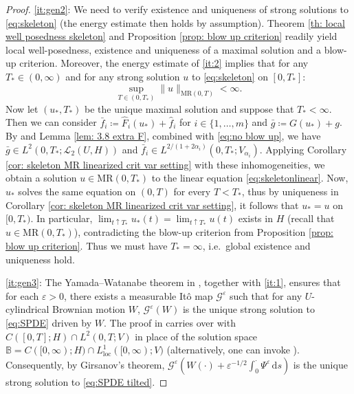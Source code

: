 \documentclass{amsart}
\newcommand{\dd}{\,\mathrm{d}}
\renewcommand{\MR}{\mathrm{MR}}
\newcommand{\UH}{\mathscr{L}_2(U,H)}
\newcommand{\<}{\langle}
\newcommand{\?}{\rangle}
\newcommand{\loc}{\mathrm{loc}}
\newcommand{\ceqq}{\coloneqq}
\newcommand{\bphieps}{\Psi^{\eps}}
\theoremstyle{plain}
\theoremstyle{remark}
\theoremstyle{plain}
\numberwithin{equation}{section}
\newcommand{\G}{\mathcal{G}}
\newcommand{\eps}{\varepsilon}
\begin{document}
\begin{proof}
\ref{it:gen2}:  We need to verify existence and uniqueness of strong solutions to \eqref{eq:skeleton} (the energy estimate then   holds by assumption). Theorem \ref{th: local well posedness skeleton} and Proposition \ref{prop: blow up criterion}  readily yield local well-posedness, existence and uniqueness of a maximal solution and a blow-up criterion. 
Moreover,  the energy estimate of  \ref{it:2} implies that for any $T_*\in(0,\infty)$ and  for any strong solution $u$ to \eqref{eq:skeleton} on $[0,T_*]$: 
\begin{equation}\label{eq:no blow up}
    \sup_{T\in(0,T_*)}\|u\|_{\MR(0,T)}<\infty. 
\end{equation}
Now let $(u_*,T_*)$ be the unique maximal solution and suppose that $T_*<\infty$. Then we can consider $\bar{f}_i\ceqq \hat{F}_i(u_*)+\hat{f}_i$ for $i\in\{1,\ldots,m\}$ and $\bar{g}\ceqq G(u_*)+g$. By \cite[Lem.\ 3.8(iv)]{TV24} and Lemma \ref{lem: 3.8 extra F}, combined with \eqref{eq:no blow up}, we have  $\bar{g}\in L^2(0,T_*;\UH)$ and $\bar{f}_i\in L^{2/(1+2\alpha_i)}(0,T_*;V_{\alpha_i})$. Applying  
  Corollary \ref{cor: skeleton MR linearized crit var setting} with these inhomogeneities, we obtain a solution $u\in\MR(0,T_*)$ to the linear equation \eqref{eq:skeletonlinear}. Now,  $u_*$ solves the same equation on $(0,T)$ for every $T<T_*$, thus by  uniqueness in Corollary \ref{cor: skeleton MR linearized crit var setting}, it follows that $u_*=u$ on $[0,T_*)$. In particular, $\lim_{t\uparrow T_*}u_*(t)=\lim_{t\uparrow T_*}u(t)$ exists in $H$ (recall that $u\in \MR(0,T_*)$), contradicting the blow-up criterion from Proposition \ref{prop: blow up criterion}. Thus we must have $T_*=\infty$, i.e.\  global existence and uniqueness hold. 

\ref{it:gen3}: 
The Yamada--Watanabe theorem in \cite{rock08}, together with \ref{it:1},  ensures  that for each $\eps>0$,   there exists a measurable It\^o map $\G^\eps$ such that for any $U$-cylindrical Brownian motion $W$, $\G^\eps(W)$ is the unique strong solution to \eqref{eq:SPDE} driven by $W$. The proof in \cite{rock08} carries over with $C([0,T];H)\cap L^2(0,T;V)$ in place of the solution space $\mathbb{B}=C([0,\infty);H)\cap L^1_\loc([0,\infty);V)$ (alternatively, one can invoke \cite[Th.\ 3.1]{T25}).
Consequently, by Girsanov's theorem, $\G^\eps(W(\cdot)+\eps^{-1/2}\int_0^\cdot \bphieps\dd s)$  is the unique strong solution to \eqref{eq:SPDE tilted}. 


\end{proof}
\end{document}
